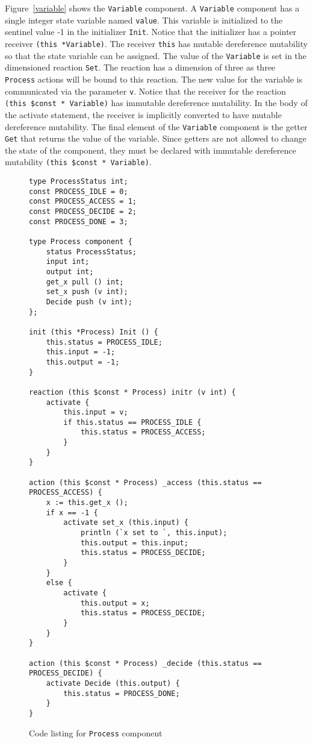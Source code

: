 Figure~\ref{variable} shows the \verb+Variable+ component.
A \verb+Variable+ component has a single integer state variable named \verb+value+.
This variable is initialized to the sentinel value -1 in the initializer \verb+Init+.
Notice that the initializer has a pointer receiver \verb+(this *Variable)+.
The receiver \verb+this+ has mutable dereference mutability so that the state variable can be assigned.
The value of the \verb+Variable+ is set in the dimensioned reaction \verb+Set+.
The reaction has a dimension of three as three \verb+Process+ actions will be bound to this reaction.
The new value for the variable is communicated via the parameter \verb+v+.
Notice that the receiver for the reaction \verb+(this $const * Variable)+ has immutable dereference mutability.
In the body of the activate statement, the receiver is implicitly converted to have mutable dereference mutability.
The final element of the \verb+Variable+ component is the getter \verb+Get+ that returns the value of the variable.
Since getters are not allowed to change the state of the component, they must be declared with immutable dereference mutability \verb+(this $const * Variable)+.

\begin{figure}
\begin{verbatim}
type ProcessStatus int;
const PROCESS_IDLE = 0;
const PROCESS_ACCESS = 1;
const PROCESS_DECIDE = 2;
const PROCESS_DONE = 3;

type Process component {
    status ProcessStatus;
    input int;
    output int;
    get_x pull () int;
    set_x push (v int);
    Decide push (v int);
};

init (this *Process) Init () {
    this.status = PROCESS_IDLE;
    this.input = -1;
    this.output = -1;
}

reaction (this $const * Process) initr (v int) {
    activate {
        this.input = v;
        if this.status == PROCESS_IDLE {
            this.status = PROCESS_ACCESS;
        }
    }
}

action (this $const * Process) _access (this.status == PROCESS_ACCESS) {
    x := this.get_x ();
    if x == -1 {
        activate set_x (this.input) {
            println (`x set to `, this.input);
            this.output = this.input;
            this.status = PROCESS_DECIDE;
        }
    }
    else {
        activate {
            this.output = x;
            this.status = PROCESS_DECIDE;
        }
    }
}

action (this $const * Process) _decide (this.status == PROCESS_DECIDE) {
    activate Decide (this.output) {
        this.status = PROCESS_DONE;
    }
}
\end{verbatim}
\cprotect\caption{Code listing for \verb+Process+ component \label{process}}
\end{figure}

